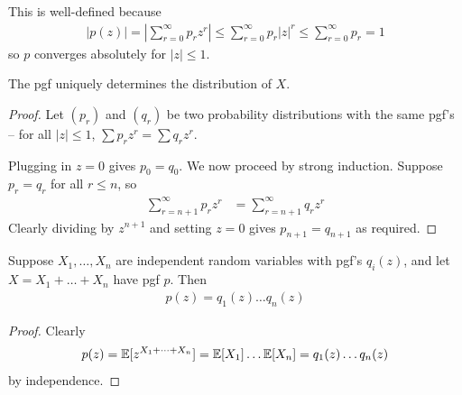 \documentclass{../../template/note}
\begin{document}
    \begin{remark*}
        This is well-defined because
        \begin{align*}
            |p(z)| = \left|\sum_{r=0}^\infty p_rz^r\right| \leq \sum_{r=0}^\infty p_r |z|^r \leq \sum_{r=0}^\infty p_r = 1
        \end{align*}
        so \(p\) converges absolutely for \(|z| \leq 1\).        
    \end{remark*}
    
    \begin{theorem}
        The pgf uniquely determines the distribution of \(X\). \label{pgf-unique}
    \end{theorem}
    
    \begin{proof}
        Let \((p_r)\) and \((q_r)\) be two probability distributions with the same pgf's -- for all \(|z| \leq 1\), \(\sum p_r z^r = \sum q_r z^r\).

        Plugging in \(z=0\) gives \(p_0 = q_0\). We now proceed by strong induction. Suppose \(p_r = q_r\) for all \(r \leq n\), so
        \begin{align*}
            \sum_{r=n+1}^\infty p_r z^r &= \sum_{r=n+1}^\infty q_rz^r
        \end{align*}
        Clearly dividing by \(z^{n+1}\) and setting \(z=0\) gives \(p_{n+1} = q_{n+1}\) as required.        
    \end{proof}

    \begin{proposition}
        Suppose \(X_1, \dots, X_n\) are independent random variables with pgf's \(q_i(z)\), and let \(X = X_1 + \dots + X_n\) have pgf \(p\). Then
        \begin{align*}
            p(z) = q_1(z)\dots q_n(z)
        \end{align*}
    \end{proposition}
    
    \begin{proof}
        Clearly
        \begin{align*}
            p(z) = \mathbb E[z^{X_1+\dots+X_n}] = \mathbb E[X_1] \dots \mathbb E[X_n] = q_1(z) \dots q_n(z)
        \end{align*}
        by independence.        
    \end{proof}
\end{document}
